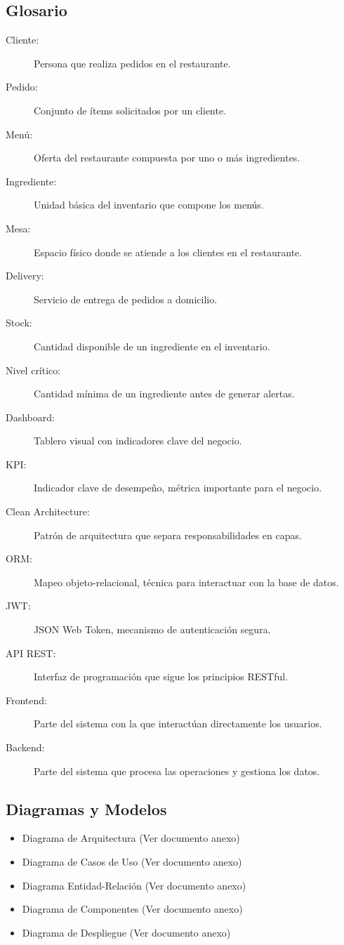\documentclass[12pt]{article}
\begin{document}
\subsection{Glosario}
\begin{description}
  \item[Cliente:] Persona que realiza pedidos en el restaurante.
  \item[Pedido:] Conjunto de ítems solicitados por un cliente.
  \item[Menú:] Oferta del restaurante compuesta por uno o más ingredientes.
  \item[Ingrediente:] Unidad básica del inventario que compone los menús.
  \item[Mesa:] Espacio físico donde se atiende a los clientes en el restaurante.
  \item[Delivery:] Servicio de entrega de pedidos a domicilio.
  \item[Stock:] Cantidad disponible de un ingrediente en el inventario.
  \item[Nivel crítico:] Cantidad mínima de un ingrediente antes de generar alertas.
  \item[Dashboard:] Tablero visual con indicadores clave del negocio.
  \item[KPI:] Indicador clave de desempeño, métrica importante para el negocio.
  \item[Clean Architecture:] Patrón de arquitectura que separa responsabilidades en capas.
  \item[ORM:] Mapeo objeto-relacional, técnica para interactuar con la base de datos.
  \item[JWT:] JSON Web Token, mecanismo de autenticación segura.
  \item[API REST:] Interfaz de programación que sigue los principios RESTful.
  \item[Frontend:] Parte del sistema con la que interactúan directamente los usuarios.
  \item[Backend:] Parte del sistema que procesa las operaciones y gestiona los datos.
\end{description}

\subsection{Diagramas y Modelos}
\begin{itemize}
  \item Diagrama de Arquitectura (Ver documento anexo)
  \item Diagrama de Casos de Uso (Ver documento anexo)
  \item Diagrama Entidad-Relación (Ver documento anexo)
  \item Diagrama de Componentes (Ver documento anexo)
  \item Diagrama de Despliegue (Ver documento anexo)
\end{itemize}
\end{document}
